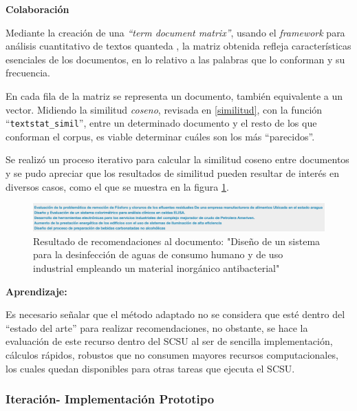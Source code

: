 \documentclass[
  12pt,
  openany]{book}
\begin{document}
\textbf{Colaboración}

Mediante la creación de una \emph{``term document matrix''}, usando el \emph{framework} para análisis cuantitativo de textos quanteda \citep{quanteda}, la matriz obtenida refleja características esenciales de los documentos, en lo relativo a las palabras que lo conforman y su frecuencia.



En cada fila de la matriz se representa un documento, también equivalente a un vector. Midiendo la similitud \emph{coseno}, revisada en \ref{similitud}, con la función ``\texttt{textstat\_simil}'', entre un determinado documento y el resto de los que conforman el corpus, es viable determinar cuáles son los más ``parecidos''.

Se realizó un proceso iterativo para calcular la similitud coseno entre documentos y se pudo apreciar que los resultados de similitud pueden resultar de interés en diversos casos, como el que se muestra en la figura \ref{fig:similitudreco}.

\begin{figure}

{\centering \includegraphics[width=0.9\linewidth]{images/05-desarrollo/2_ciclo/similitud_reco2} 

}

\caption{Resultado de recomendaciones al documento: "Diseño de un sistema para la desinfección de aguas de consumo humano y de uso industrial empleando un material inorgánico antibacterial"}\label{fig:similitudreco}
\end{figure}

\textbf{Aprendizaje:}

Es necesario señalar que el método adaptado no se considera que esté dentro del ``estado del arte'' para realizar recomendaciones, no obstante, se hace la evaluación de este recurso dentro del SCSU al ser de sencilla implementación, cálculos rápidos, robustos que no consumen mayores recursos computacionales, los cuales quedan disponibles para otras tareas que ejecuta el SCSU.

\hypertarget{iterbol}{%
\subsubsection{Iteración- Implementación Prototipo}\label{iterbol}}
\end{document}
